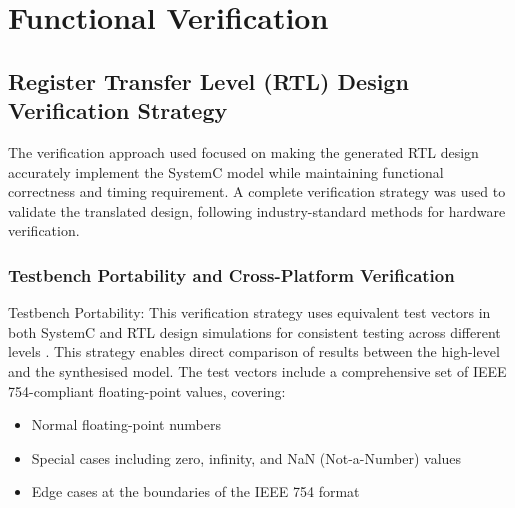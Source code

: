 
\chapter{Functional Verification }
\label{chap:rtl_verification}


\section{Register Transfer Level (RTL) Design Verification Strategy}
\label{sec:rtl_verification_strategy}

The verification approach used focused on making the generated RTL design accurately implement the SystemC model while maintaining functional correctness and timing requirement. A complete verification strategy was used to validate the translated design, following industry-standard methods for hardware verification.

\subsection{Testbench Portability and Cross-Platform Verification}
\label{subsec:testbench_portability}


Testbench Portability: This verification strategy uses equivalent test vectors in both SystemC and RTL design simulations for consistent testing across different levels \cite{ref16}. This strategy enables direct comparison of results between the high-level and the synthesised model. The test vectors include a comprehensive set of IEEE 754-compliant floating-point values, covering:
\begin{itemize}
    \item Normal floating-point numbers
    \item Special cases including zero, infinity, and NaN (Not-a-Number) values
    \item Edge cases at the boundaries of the IEEE 754 format
\end{itemize}

\newpage

